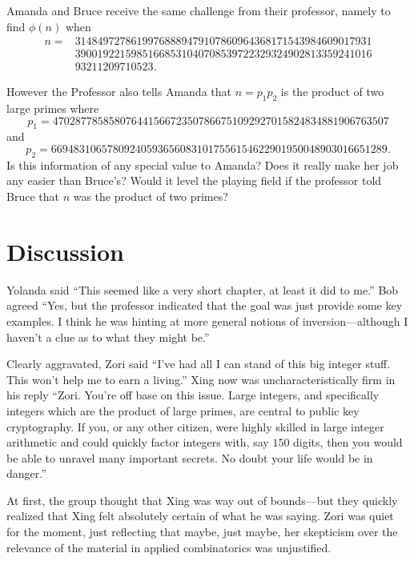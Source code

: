 \begin{example}
Amanda and Bruce receive the same challenge from their professor, namely
to find $\phi(n)$ when 
\begin{align*}
n  = &31484972786199768889479107860964368171543984609017931\\
   &  39001922159851668531040708539722329324902813359241016\\
   &  93211209710523.
\end{align*}

However the Professor also tells Amanda that $n=p_1p_2$ is the product
of two large primes where
\[
p_1 = 470287785858076441566723507866751092927015824834881906763507
\]
and
\[
p_2 = 669483106578092405936560831017556154622901950048903016651289.
\]
Is this information of any special value to Amanda?  Does it really make
her job any easier than Bruce's?  Would it level the playing field
if the professor told Bruce that $n$ was the product of two primes?
\end{example}

\section{Discussion}\label{s:inclusion-exclusion:discussion}

Yolanda said ``This seemed like a very short chapter, at least it did to
me.''  Bob agreed ``Yes, but the professor indicated that the goal
was just provide some key examples.  I think he was hinting at more
general notions of inversion---although I haven't a clue as to what
they might be.''

Clearly aggravated, Zori said ``I've had all I can stand of
this big integer stuff.  This won't help me to earn a living.''
Xing now was uncharacteristically firm in his reply ``Zori.
You're off base on this issue.  Large integers, and specifically
integers which are the product of large primes, are central to
public key cryptography.  If you, or any other citizen, were
highly skilled in large integer arithmetic and could quickly
factor integers with, say $150$ digits, then you would be able
to unravel many important secrets.  No doubt your life would
be in danger.''

At first, the group thought that Xing was way out of bounds---but
they quickly realized that Xing felt absolutely certain of what he
was saying.  Zori was quiet for the moment, just reflecting
that maybe, just maybe, her skepticism over the relevance
of the material in applied combinatorics was unjustified. 

